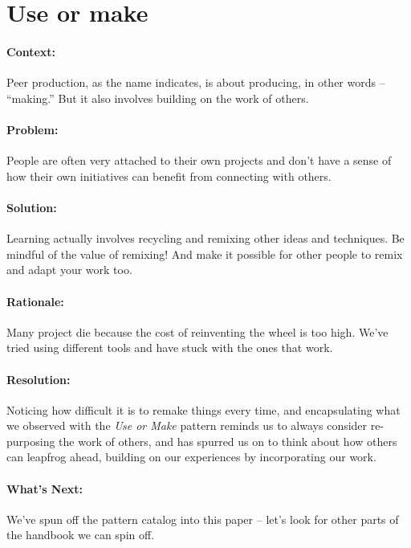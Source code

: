 \section{Use or make}
\paragraph{Context:}
Peer production, as the name indicates, is about producing, in other words --
``making.'' But it also involves building on the work of others.

\paragraph{Problem:}
People are often very attached to their own projects and don't have a sense of how their own initiatives can benefit from connecting with others.

\paragraph{Solution:} Learning actually involves recycling and remixing other ideas and techniques. Be mindful of the value of remixing!  And make it possible for other people to remix and adapt your work too.

\paragraph{Rationale:} 
Many project die because the cost of reinventing the wheel is too high.  We've tried using different tools and have stuck with the ones that work.

\paragraph{Resolution:} Noticing how difficult it is to remake things every time, and encapsulating what we observed with the \emph{Use or Make} pattern reminds us to always consider re-purposing the work of others, and has spurred us on to think about how others can leapfrog ahead, building on our experiences by incorporating our work.

\paragraph{What's Next:} We've spun off the pattern catalog into this paper -- let's look for other parts of the handbook we can spin off.

